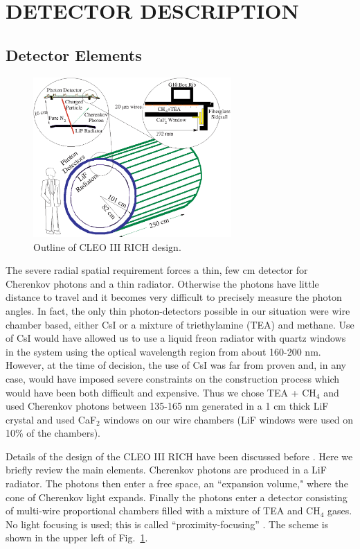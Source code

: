 \documentclass[fleqn,twoside]{article}
\begin{document}
\section{DETECTOR DESCRIPTION}

\subsection{Detector Elements}

\begin{figure}[htb]
\vspace{-.5cm}
\includegraphics[height=2.4in]{RICH_descrip.eps}
\vspace{-1cm} \caption{\label{RICH_descrip}Outline of CLEO III
RICH design.} \vspace{-0.7cm}\end{figure}

The severe radial spatial requirement forces a thin, few cm
detector for Cherenkov photons and a thin radiator. Otherwise the
photons have little distance to travel and it becomes very
difficult to precisely measure the photon angles. In fact, the
only thin photon-detectors possible in our situation were wire
chamber based, either CsI or a mixture of triethylamine (TEA) and
methane. Use of CsI would have allowed us to use a liquid freon
radiator with quartz windows in the system using the optical
wavelength region from about 160-200 nm. However, at the time of
decision, the use of CsI was far from proven and, in any case,
would have imposed severe constraints on the construction process
which would have been both difficult and expensive. Thus we chose
TEA + CH$_4$ and used Cherenkov photons between 135-165 nm
generated in a 1 cm thick LiF crystal and used CaF$_2$ windows on
our wire chambers (LiF windows were used on 10\% of the chambers)\cite{Arno92}.

Details of the design of the CLEO III RICH have been discussed before
\cite{testbeam}. Here we briefly review the main elements.
Cherenkov photons are produced in a LiF radiator. The photons then enter
a free space, an ``expansion volume," where the cone of Cherenkov light
expands. Finally the photons enter a detector consisting of
multi-wire proportional chambers filled with a mixture of TEA
and CH$_4$ gases.
No light focusing is used; this is called ``proximity-focusing''
\cite{t+j}. The scheme is shown in the upper left of Fig.~\ref{RICH_descrip}.
\end{document}
